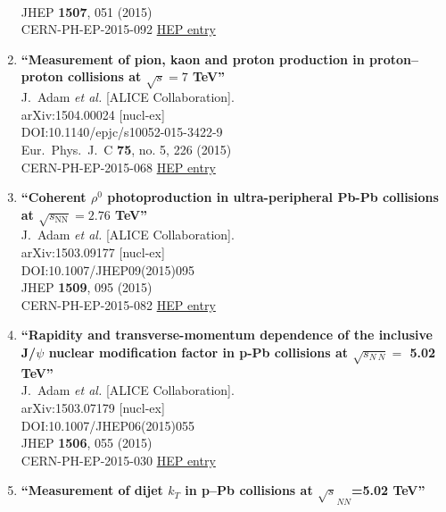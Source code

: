 \begin{enumerate}
  \\{}JHEP {\bf 1507}, 051 (2015)
  \\{}CERN-PH-EP-2015-092
\href{http://inspirehep.net/record/1364887}{HEP entry}
\item%
{\bf ``Measurement of pion, kaon and proton production in proton–proton collisions at $\sqrt{s} = 7$ TeV''}
  \\{}J.~Adam {\it et al.} [ALICE Collaboration].
  \\{}arXiv:1504.00024 [nucl-ex]
  \\{}DOI:10.1140/epjc/s10052-015-3422-9
  \\{}Eur.\ Phys.\ J.\ C {\bf 75}, no. 5, 226 (2015)
  \\{}CERN-PH-EP-2015-068
\href{http://inspirehep.net/record/1357424}{HEP entry}
\item%
{\bf ``Coherent $\rho^{0}$ photoproduction in ultra-peripheral Pb-Pb collisions at \linebreak $ \sqrt{s_{\mathrm{NN}}}=2.76 $ TeV''}
  \\{}J.~Adam {\it et al.} [ALICE Collaboration].
  \\{}arXiv:1503.09177 [nucl-ex]
  \\{}DOI:10.1007/JHEP09(2015)095
  \\{}JHEP {\bf 1509}, 095 (2015)
  \\{}CERN-PH-EP-2015-082
\href{http://inspirehep.net/record/1357206}{HEP entry}
\item%
{\bf ``Rapidity and transverse-momentum dependence of the inclusive J/$\psi$ nuclear modification factor in p-Pb collisions at $ \sqrt{s_{N\ N}} =$ 5.02 TeV''}
  \\{}J.~Adam {\it et al.} [ALICE Collaboration].
  \\{}arXiv:1503.07179 [nucl-ex]
  \\{}DOI:10.1007/JHEP06(2015)055
  \\{}JHEP {\bf 1506}, 055 (2015)
  \\{}CERN-PH-EP-2015-030
\href{http://inspirehep.net/record/1355544}{HEP entry}
\item%
{\bf ``Measurement of dijet $k_T$ in p–Pb collisions at $\sqrt{s}_{NN}$=5.02 TeV''}

\end{enumerate}
